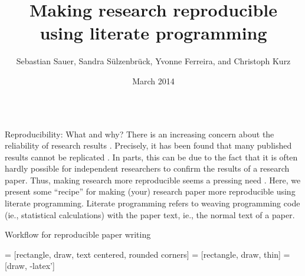 \documentclass[final,hyperref={pdfpagelabels=false}]{beamer}
\title{Making research reproducible \\using literate programming}
\author{Sebastian Sauer, Sandra S\"ulzenbr\"uck, Yvonne Ferreira, and Christoph Kurz}
\institute{FOM University of Applied Sciences, Helmholtz Zentrum M\"unchen}
\date{March 2014}
\begin{document}
  \begin{frame}{} 
    
      \begin{columns}[t]
      
      \begin{column}{.48\linewidth}
      
        \begin{block}{Reproducibility: What and why?}
      There is an increasing concern about the reliability of research results \cite{Peng2015}.
    Precisely, it has been found that many published results cannot be replicated \cite{OpenScienceCollaboration2015}.
    In parts, this can be due to the fact that it is often hardly possible for independent researchers to
    confirm the results of a research paper. Thus, making research more reproducible seems a pressing need  \cite{Peng2015}.
    Here, we present some ``recipe'' for making (your) research paper more reproducible using literate programming.
    Literate programming refers to weaving programming code (ie., statistical calculations) with the paper text, ie., the normal text of a paper.    
    
    \end{block}
      
      
      
            \begin{block}{Workflow for reproducible paper writing}
         
      \begin{minipage}[t]{0.45\textwidth}
       = [rectangle, draw, text centered, rounded corners]
       = [rectangle, draw, thin]
       = [draw, -latex']
      \begin{tikzpicture}[node distance=7cm, auto]
        

\end{tikzpicture}
\end{minipage}
\end{block}
\end{column}
\end{columns}
\end{frame}
\end{document}
